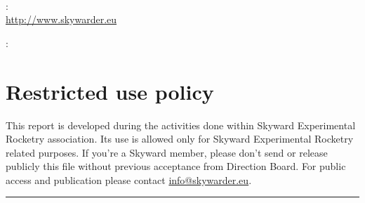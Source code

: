 \thispagestyle{empty}

\hfill
\vspace{5cm}

\\

\vfill

\begin{multicols}{2}
\medskip
{}: \\
\url{http://www.skywarder.eu}


\medskip
{}: \\
\mail{\myEmail}
\vfill
\columnbreak
\section*{Restricted use policy}
\fontsize{8}{11} \selectfont This report is developed during the activities done within Skyward Experimental Rocketry association. Its use is allowed only for Skyward Experimental Rocketry related purposes. If you're a Skyward member, please don't send or release publicly this file without previous acceptance from Direction Board.
For public access and publication please contact \href{mailto:info@skywarder.eu}{info@skywarder.eu}.
\end{multicols}
\vspace{1cm}
\hrule
\bigskip
\clearpage
